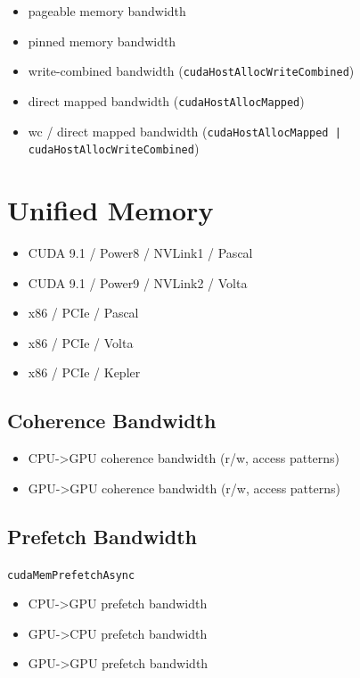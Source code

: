 \begin{itemize}
    \item pageable memory bandwidth
    \item pinned memory bandwidth
    \item write-combined bandwidth (\texttt{cudaHostAllocWriteCombined})
    \item direct mapped bandwidth  (\texttt{cudaHostAllocMapped})
    \item wc / direct mapped bandwidth  (\texttt{cudaHostAllocMapped | cudaHostAllocWriteCombined})
\end{itemize}

\section{Unified Memory}

\begin{itemize}
    \item CUDA 9.1 / Power8 / NVLink1 / Pascal
    \item CUDA 9.1 / Power9 / NVLink2 / Volta
    \item x86 / PCIe / Pascal
    \item x86 / PCIe / Volta
    \item x86 / PCIe / Kepler
\end{itemize}

\subsection{Coherence Bandwidth}
\begin{itemize}
    \item CPU->GPU coherence bandwidth (r/w, access patterns)
    \item GPU->GPU coherence bandwidth (r/w, access patterns)
\end{itemize}
    
\subsection{Prefetch Bandwidth}

\texttt{cudaMemPrefetchAsync}

\begin{itemize}
    \item CPU->GPU prefetch bandwidth
    \item GPU->CPU prefetch bandwidth
    \item GPU->GPU prefetch bandwidth 
\end{itemize}


